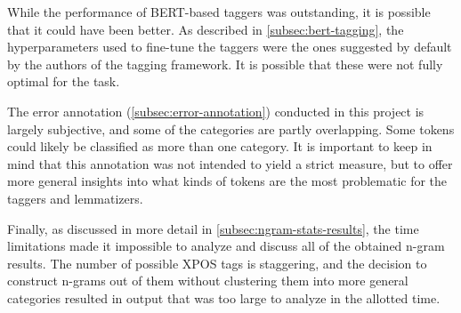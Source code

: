 While the performance of BERT-based taggers was outstanding, it is possible that it could have been better. As described in \autoref{subsec:bert-tagging}, the hyperparameters used to fine-tune the taggers were the ones suggested by default by the authors of the tagging framework. It is possible that these were not fully optimal for the task.

The error annotation (\autoref{subsec:error-annotation}) conducted in this project is largely subjective, and some of the categories are partly overlapping. Some tokens could likely be classified as more than one category. It is important to keep in mind that this annotation was not intended to yield a strict measure, but to offer more general insights into what kinds of tokens are the most problematic for the taggers and lemmatizers.

Finally, as discussed in more detail in \autoref{subsec:ngram-stats-results}, the time limitations made it impossible to analyze and discuss all of the obtained n-gram results. The number of possible XPOS tags is staggering, and the decision to construct n-grams out of them without clustering them into more general categories resulted in output that was too large to analyze in the allotted time. 